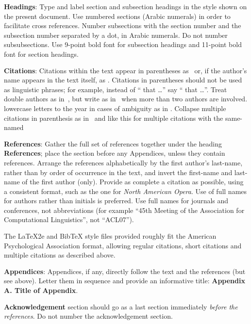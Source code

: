 \documentclass[]{article}
\begin{document}
{\bf Headings}: Type and label section and subsection headings in the
style shown on the present document.  Use numbered sections (Arabic
numerals) in order to facilitate cross references. Number subsections
with the section number and the subsection number separated by a dot,
in Arabic numerals. Do not number subsubsections. Use 9-point bold
font for subsection headings and 11-point bold font for section
headings.

{\bf Citations}: Citations within the text appear in parentheses
as~\citep{Smith} or, if the author's name appears in the text itself,
as \cite{Smith}. Citations in parentheses should not be used as
linguistic phrases; for example, instead of ``\citep{Smith}
 that \ldots'' say ``\cite{Smith} 
that \ldots''.  Treat double authors as in~\citep{DD15}, but write as
in~\citep{PDC} when more than two authors are involved.
 lowercase letters to the year in cases of ambiguity
as in \citep{JonesFirst}.  Collapse multiple citations in parenthesis
as in~\citep{Smith,JonesFirst} and like this for multiple citations
with the same-named 
\citep{Smith,SmithConc,JonesFirst,JonesSecond}

\textbf{References}: Gather the full set of references together under the
heading {\bf References}; place the section before any Appendices, unless they
contain references. Arrange the references alphabetically by the first
author's last-name, rather than by order of occurrence in the text, and invert
the first-name and last-name of the first author (only). Provide as complete
a citation as possible, using a consistent format, such as the one for {\em
North American Opera\/}.  Use of full names for
authors rather than initials is preferred.  Use full names for journals and
conferences, not abbreviations (for example ``45th Meeting of the Association
for Computational Linguistics'', not ``ACL07'').

The \LaTeX2e{} and Bib\TeX{} style files provided roughly fit the
American Psychological Association format, allowing regular citations,
short citations and multiple citations as described above.

{\bf Appendices}: Appendices, if any, directly follow the text and the
references (but see above).  Letter them in sequence and provide an
informative title: {\bf Appendix A. Title of Appendix}.

\textbf{Acknowledgement} section should go as a last section immediately
\textit{before the references}.  Do not number the acknowledgement section.
\end{document}
